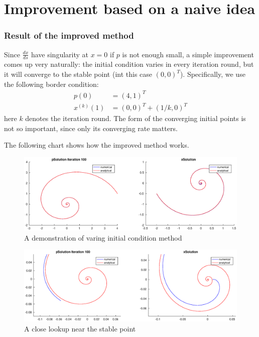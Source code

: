 \documentclass[a4paper]{article}
\begin{document}
\part{Improvement based on a naive idea}
\section{Result of the improved method}
Since $\frac{dx}{ds}$ have singularity at $x=0$ if $p$ is not enough small, a simple improvement comes up very naturally: the initial condition varies in every iteration round, but it will converge to the stable point (int this case $(0, 0)^T$).
Specifically, we use the following border condition:
\begin{align}
	p(0) &= (4, 1)^T \\
	x^{(k)}(1) &= (0, 0)^T + (1/k, 0)^T
\end{align}
here $k$ denotes the iteration round.
The form of the converging initial points is not so important, since only its converging rate matters.

The following chart shows how the improved method works.
\begin{figure}[h]
	\centering
	\includegraphics[width=\textwidth]{part3-demo}
	\caption{A demonstration of varing initial condition method}
	\label{fig:p3-demo}
\end{figure}
\begin{figure}[h]
	\centering
	\includegraphics[width=\textwidth]{part3-demo-zoomin}
	\caption{A close lookup near the stable point}
	\label{fig:p3-demo-zoomin}
\end{figure}
\end{document}
